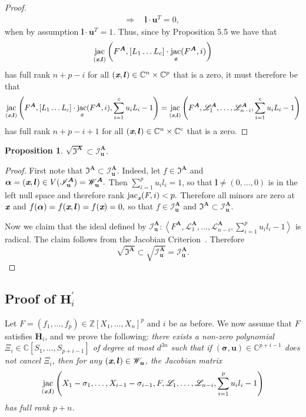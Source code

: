 \documentclass[a4paper]{article}
\def\sL{\mathscr{L}}
\def\sLA{\mathscr{L}^{\mA}}
\def\mA{{\bm A}}
\def\ub{{\bm u}}
\def\lb{{\bm l}}
\def\xb{\textit{\textbf{x}}}
\DeclareMathOperator{\jac}{jac}
\newcommand{\ZZ}{{\mathbb{Z}}}
\def\C{\mathbb{C}}
\def\IA{\mathfrak{I}^{\mA}}
\def\IAr{\sqrt{\mathfrak{I}^{\mA}}}
\def\IlA{\mathscr{I}_{\ub}^{\mA}}
\def\Wl{\mathscr{W}_{\ub}}
\def\WlA{\mathscr{W}_{\ub}^{\mA}}
\def\udl{\sum_{i=1}^pu_il_i}
\newtheorem{prop}[theorem]{Proposition}
\begin{document}
\begin{proof}
\begin{align*}
        \Rightarrow
        ~&~\lb \cdot \ub^T = 0,
    \end{align*}
    when by assumption $\lb \cdot \ub^T = 1.$ Thus, since by Proposition 5.5 we have that
    \[
   \jac_{(\xb,\lb)} \left(F^{\mA},[L_1 \hdots L_c] \cdot \jac_{\xb} (F^{\mA}, i)\right)
    \]
    has full rank $n+p-i$ for all $(\xb, \bm l) \in \C^n \times \C^p$ that is a zero, it must therefore be that 
    \[
    \jac_{(\xb,\lb)} \left(F^{\mA},[L_1 \hdots L_c] \cdot \jac_{\xb} (F^{\mA}, i),\sum_{i=1}^c u_iL_i-1\right)
    =
        \jac_{(\xb,\lb)} \left(F^{\mA},\sLA_1,\hdots,\sLA_{n-i},\sum_{i=1}^c u_iL_i-1\right)
    \]
    has full rank $n+p-i+1$ for all $(\xb, \bm l) \in \C^n \times \C^c$ that is a zero.
    \end{proof}
    \begin{prop}
    $
    \IAr \subset \IlA. 
    $
    \end{prop}
    \begin{proof}
    First note that $\IA \subset \IlA.$ Indeed, let $f \in \IA$ and $\bm \alpha = (\xb,\lb) \in V(\IlA)=\WlA.$ Then $\sum_{i=1}^p u_i l_i = 1$, so that $\lb \not = (0,\hdots,0)$ is in the left null space and therefore rank $\jac_{\xb} (F,i) < p.$ Therefore all minors are zero at $\xb$ and $f(\bm \alpha)= f(\xb,\lb)=f(\xb)=0,$ so that $f \in \IlA$ and $\IA \subset \IlA.$
    \par 
    Now we claim that the ideal defined by $\IlA:\left\langle F^{\mA},\sLA_1,\hdots,\sLA_{n-i},\udl-1 \right\rangle$ is radical. The claim follows from the Jacobian Criterion~\cite[Corollary 16.20]{ECA}. Therefore 
    \[
    \IAr \subset \sqrt{\IlA} = \IlA.
    \]
    \end{proof}




\subsection{Proof of $\textbf{H}_i^{'}$}
Let $F = (f_1,\hdots,f_p) \in \ZZ[X_1,\hdots,X_n]^p$ and $i$ be as before. We now assume
that $F$ satisfies $\textbf{H}_i$, and we prove the following: {\em
  there exists a non-zero polynomial $\Xi_{i} \in
  \C[S_1,\dots,S_{p+i-1}]$ of degree at most $d^{3n}$ such that if $
  (\bm \sigma,\ub) \in \C^{p+i-1}$ does not cancel
  $\Xi_{i}$, then for any $(\xb,\lb) \in \Wl$, the Jacobian matrix
  $$\jac_{(\xb,\lb)}\left(X_1-\sigma_1,\dots,X_{i-1}-\sigma_{i-1},F,\sL_1,\hdots,\sL_{n-i},\udl-1\right)$$ has full rank $p+n$.}
\end{document}
